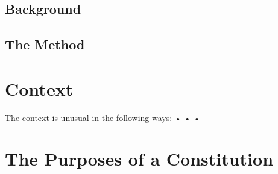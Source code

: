 \documentclass[10pt,titlepage]{book}
\begin{document}
\section{Background}



\section{The Method}

\chapter{Context}

The context is unusual in the following ways:
•
•
•

\chapter{The Purposes of a Constitution}


%
%






\end{document}
